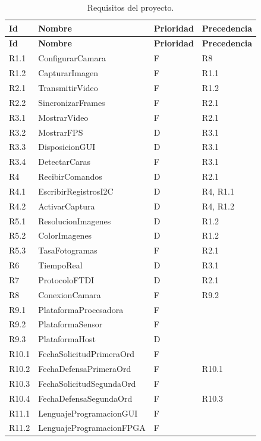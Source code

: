 \documentclass[../main.tex]{subfiles}
\begin{document}
\begin{longtable}{llll}
\caption{Requisitos del proyecto.}
\label{tab:requisitos} \\

\rowcolor[HTML]{156082}
{\color{white}\textbf{Id}} & {\color{white}\textbf{Nombre}} & {\color{white}\textbf{Prioridad}} & {\color{white}\textbf{Precedencia}} \\
\endfirsthead

\rowcolor[HTML]{156082}
{\color{white}\textbf{Id}} & {\color{white}\textbf{Nombre}} & {\color{white}\textbf{Prioridad}} & {\color{white}\textbf{Precedencia}} \\
\endhead

R1.1 & ConfigurarCamara & F & R8 \\
\rowcolor[HTML]{C0E6F5}
R1.2 & CapturarImagen & F & R1.1 \\
R2.1 & TransmitirVideo & F & R1.2 \\
\rowcolor[HTML]{C0E6F5}
R2.2 & SincronizarFrames & F & R2.1 \\
R3.1 & MostrarVideo & F & R2.1 \\
\rowcolor[HTML]{C0E6F5}
R3.2 & MostrarFPS & D & R3.1 \\
R3.3 & DisposicionGUI & D & R3.1 \\
\rowcolor[HTML]{C0E6F5}
R3.4 & DetectarCaras & F & R3.1 \\
R4 & RecibirComandos & D & R2.1 \\
\rowcolor[HTML]{C0E6F5}
R4.1 & EscribirRegistrosI2C & D & R4, R1.1 \\
R4.2 & ActivarCaptura & D & R4, R1.2 \\
\rowcolor[HTML]{C0E6F5}
R5.1 & ResolucionImagenes & D & R1.2 \\
R5.2 & ColorImagenes & D & R1.2 \\
\rowcolor[HTML]{C0E6F5}
R5.3 & TasaFotogramas & F & R2.1 \\
R6 & TiempoReal & D & R3.1 \\
\rowcolor[HTML]{C0E6F5}
R7 & ProtocoloFTDI & D & R2.1 \\
R8 & ConexionCamara & F & R9.2 \\
\rowcolor[HTML]{C0E6F5}
R9.1 & PlataformaProcesadora & F & \\
R9.2 & PlataformaSensor & F & \\
\rowcolor[HTML]{C0E6F5}
R9.3 & PlataformaHost & D & \\
R10.1 & FechaSolicitudPrimeraOrd & F & \\
\rowcolor[HTML]{C0E6F5}
R10.2 & FechaDefensaPrimeraOrd & F & R10.1 \\
R10.3 & FechaSolicitudSegundaOrd & F & \\
\rowcolor[HTML]{C0E6F5}
R10.4 & FechaDefensaSegundaOrd & F & R10.3 \\
R11.1 & LenguajeProgramacionGUI & F & \\
\rowcolor[HTML]{C0E6F5}
R11.2 & LenguajeProgramacionFPGA & F & \\
\end{longtable}
\end{document}
